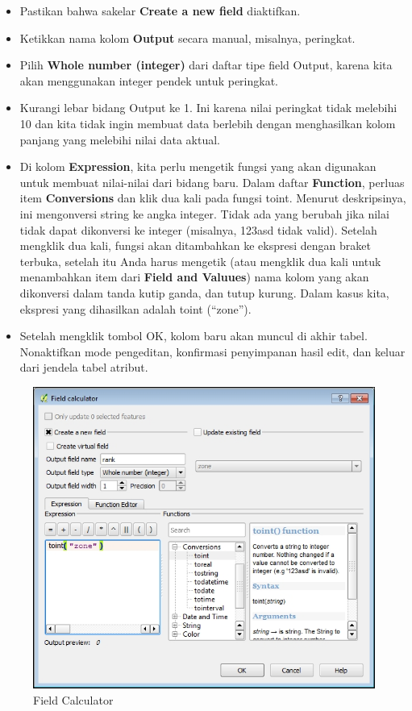 \documentclass[]{book}
\begin{document}
\begin{itemize}
\item
  Pastikan bahwa sakelar \textbf{Create a new field} diaktifkan.
\item
  Ketikkan nama kolom \textbf{Output} secara manual, misalnya, peringkat.
\item
  Pilih \textbf{Whole number (integer)} dari daftar tipe field Output, karena kita akan menggunakan integer pendek untuk peringkat.
\item
  Kurangi lebar bidang Output ke 1. Ini karena nilai peringkat tidak melebihi 10 dan kita tidak ingin membuat data berlebih dengan menghasilkan kolom panjang yang melebihi nilai data aktual.
\item
  Di kolom \textbf{Expression}, kita perlu mengetik fungsi yang akan digunakan untuk membuat nilai-nilai dari bidang baru. Dalam daftar \textbf{Function}, perluas item \textbf{Conversions} dan klik dua kali pada fungsi toint. Menurut deskripsinya, ini mengonversi string ke angka integer. Tidak ada yang berubah jika nilai tidak dapat dikonversi ke integer (misalnya, 123asd tidak valid). Setelah mengklik dua kali, fungsi akan ditambahkan ke ekspresi dengan braket terbuka, setelah itu Anda harus mengetik (atau mengklik dua kali untuk menambahkan item dari \textbf{Field and Valuues}) nama kolom yang akan dikonversi dalam tanda kutip ganda, dan tutup kurung. Dalam kasus kita, ekspresi yang dihasilkan adalah toint (``zone'').
\item
  Setelah mengklik tombol OK, kolom baru akan muncul di akhir tabel. Nonaktifkan mode pengeditan, konfirmasi penyimpanan hasil edit, dan keluar dari jendela tabel atribut.
\end{itemize}

\begin{figure}

{\centering \includegraphics[width=0.7\linewidth]{images/04/fig33} 

}

\caption{Field Calculator}\label{fig:fig1433}
\end{figure}
\end{document}
